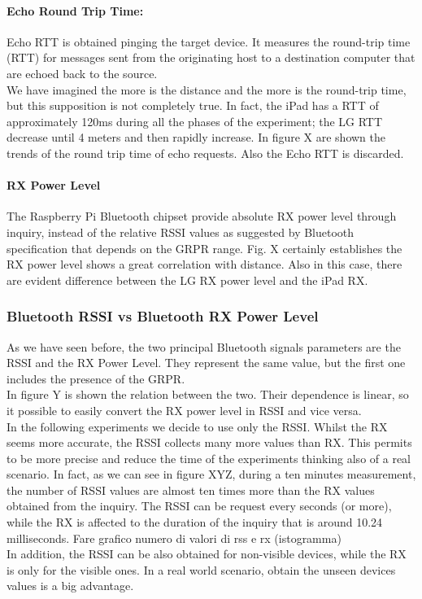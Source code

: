 \paragraph{Echo Round Trip Time:} Echo RTT is obtained pinging the target device. It measures the round-trip time (RTT) for messages sent from the originating host to a destination computer that are echoed back to the source.\\
We have imagined the more is the distance and the more is the round-trip time, but this supposition is not completely true. In fact, the iPad has a RTT of approximately 120ms during all the phases of the experiment; the LG RTT decrease until 4 meters and then rapidly increase. In figure X are shown the trends of the round trip time of echo requests. Also the Echo RTT is discarded.
\paragraph{RX Power Level}
The Raspberry Pi Bluetooth chipset provide absolute RX power level through inquiry, instead of the relative RSSI values as suggested by Bluetooth specification that depends on the GRPR range. Fig. X certainly establishes the RX power level shows a great correlation with distance. Also in this case, there are evident difference between the LG RX power level and the iPad RX.

\subsubsection{Bluetooth RSSI vs Bluetooth RX Power Level}
As we have seen before, the two principal Bluetooth signals parameters are the RSSI and the RX Power Level. 
They represent the same value, but the first one includes the presence of the GRPR. \\
In figure Y is shown the relation between the two. Their dependence is linear, so it possible to easily convert the RX power level in RSSI  and vice versa.\\
In the following experiments we decide to use only the RSSI. Whilst the RX seems more accurate, the RSSI collects many more values than RX. This permits to be more precise and reduce the time of the experiments thinking also of a real scenario. In fact, as we can see in figure XYZ,  during a ten minutes measurement, the number of RSSI values are almost ten times more than the RX values obtained from the inquiry. The RSSI can be request every seconds (or more), while the RX is affected to the duration of the inquiry that is around 10.24 milliseconds.
Fare grafico numero di valori di rss e rx (istogramma)\\
In addition, the RSSI can be also obtained for non-visible devices, while the RX is only for the visible ones. In a real world scenario, obtain the unseen devices values is a big advantage.

